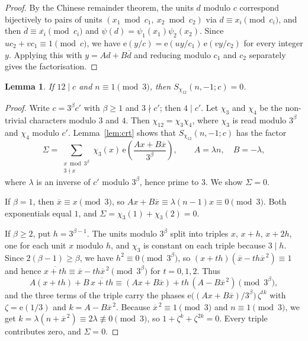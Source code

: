 \documentclass[11pt]{amsart}
\numberwithin{equation}{section}
\newtheorem{lemma}[theorem]{Lemma}
\theoremstyle{definition}
\theoremstyle{remark}
\newcommand{\e}{\mathrm{e}}
\newcommand{\inv}[1]{\overline{#1}}
\begin{document}
\begin{proof}
By the Chinese remainder theorem, the units $d$ modulo $c$ correspond bijectively to pairs of units $(x_1\bmod c_1,\ x_2\bmod c_2)$ via $d\equiv x_i\pmod{c_i}$, and then $\inv d\equiv\inv{x_i}\pmod{c_i}$ and $\psi(d)=\psi_1(x_1)\psi_2(x_2)$. Since $uc_2+vc_1\equiv1\pmod{c}$, we have $\e(y/c)=\e(uy/c_1)\,\e(vy/c_2)$ for every integer $y$. Applying this with $y=Ad+B\inv d$ and reducing modulo $c_1$ and $c_2$ separately gives the factorisation.
\end{proof}

\begin{lemma}\label{lem:twisted}
If $12\mid c$ and $n\equiv1\pmod3$, then $S_{\chi_{12}}(n,-1;c)=0$.
\end{lemma}

\begin{proof}
Write $c=3^\beta c'$ with $\beta\ge1$ and $3\nmid c'$; then $4\mid c'$. Let $\chi_3$ and $\chi_4$ be the non-trivial characters modulo $3$ and $4$. Then $\chi_{12}=\chi_3\chi_4$, where $\chi_3$ is read modulo $3^\beta$ and $\chi_4$ modulo $c'$. Lemma~\ref{lem:crt} shows that $S_{\chi_{12}}(n,-1;c)$ has the factor
\[
\Sigma=\sum_{\substack{x\bmod 3^\beta\\ 3\nmid x}}\chi_3(x)\,\e\!\left(\frac{Ax+B\inv x}{3^\beta}\right),\qquad A=\lambda n,\quad B=-\lambda,
\]
where $\lambda$ is an inverse of $c'$ modulo $3^\beta$, hence prime to $3$. We show $\Sigma=0$.

If $\beta=1$, then $\inv x\equiv x\pmod 3$, so $Ax+B\inv x\equiv\lambda(n-1)x\equiv0\pmod3$. Both exponentials equal $1$, and $\Sigma=\chi_3(1)+\chi_3(2)=0$.

If $\beta\ge2$, put $h=3^{\beta-1}$. The units modulo $3^\beta$ split into triples $x,\,x+h,\,x+2h$, one for each unit $x$ modulo $h$, and $\chi_3$ is constant on each triple because $3\mid h$. Since $2(\beta-1)\ge\beta$, we have $h^2\equiv0\pmod{3^\beta}$, so
$(x+th)(\inv x-th\inv x^{\,2})\equiv1$ and hence $\inv{x+th}\equiv\inv x-th\inv x^{\,2}\pmod{3^\beta}$ for $t=0,1,2$. Thus
\[
A(x+th)+B\,\inv{x+th}\equiv(Ax+B\inv x)+th\,(A-B\inv x^{\,2})\pmod{3^\beta},
\]
and the three terms of the triple carry the phases $\e\bigl((Ax+B\inv x)/3^\beta\bigr)\,\zeta^{tk}$ with $\zeta=\e(1/3)$ and $k=A-B\inv x^{\,2}$. Because $\inv x^{\,2}\equiv1\pmod3$ and $n\equiv1\pmod 3$, we get $k=\lambda(n+\inv x^{\,2})\equiv2\lambda\not\equiv0\pmod3$, so $1+\zeta^k+\zeta^{2k}=0$. Every triple contributes zero, and $\Sigma=0$.
\end{proof}
\end{document}
